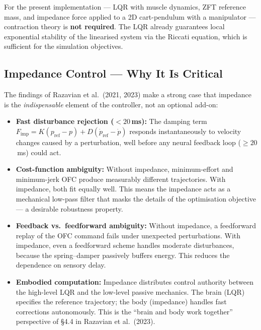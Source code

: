 \documentclass[11pt]{article}
\begin{document}
For the present implementation --- LQR with muscle dynamics, ZFT reference mass,
and impedance force applied to a 2D cart-pendulum with a manipulator --- contraction
theory is \textbf{not required}.  The LQR already guarantees local exponential
stability of the linearised system via the Riccati equation, which is sufficient
for the simulation objectives.

\subsection*{Impedance Control --- Why It Is Critical}

The findings of Razavian et al.\ (2021, 2023) make a strong case that impedance
is the \emph{indispensable} element of the controller, not an optional add-on:

\begin{itemize}
    \item \textbf{Fast disturbance rejection ($<20$\,ms):}
          The damping term $F_\text{imp} = K(p_\text{ref}-p) + D(\dot{p}_\text{ref}-\dot{p})$
          responds instantaneously to velocity changes caused by a perturbation,
          well before any neural feedback loop ($\geq 20$\,ms) could act.

    \item \textbf{Cost-function ambiguity:}
          Without impedance, minimum-effort and minimum-jerk OFC produce measurably
          different trajectories.  With impedance, both fit equally well.  This means
          the impedance acts as a mechanical low-pass filter that masks the details
          of the optimisation objective --- a desirable robustness property.

    \item \textbf{Feedback vs.\ feedforward ambiguity:}
          Without impedance, a feedforward replay of the OFC command fails under
          unexpected perturbations.  With impedance, even a feedforward scheme
          handles moderate disturbances, because the spring--damper passively buffers
          energy.  This reduces the dependence on sensory delay.

    \item \textbf{Embodied computation:}
          Impedance distributes control authority between the high-level LQR and the
          low-level passive mechanics.  The brain (LQR) specifies the reference
          trajectory; the body (impedance) handles fast corrections autonomously.
          This is the ``brain and body work together'' perspective of \S4.4 in
          Razavian et al.\ (2023).
\end{itemize}
\end{document}
